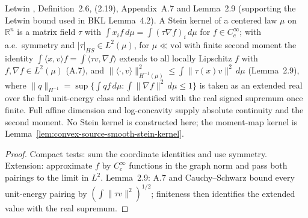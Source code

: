 \begin{lemma}
  \label{lem:letwin-stein-dual}
  \leanok
  Letwin \cite{Letwin2026QuadraticKLS}, Definition~2.6, (2.19), Appendix~A.7 and Lemma~2.9 (supporting the
  Letwin bound used in BKL Lemma~4.2). A Stein kernel of a centered law $\mu$ on $\mathbb R^n$ is a
  matrix field $\tau$ with $\int x_if\,d\mu=\int(\tau\nabla f)_i\,d\mu$ for $f\in C_c^\infty$; with
  a.e.\ symmetry and $|\tau|_{HS}\in L^2(\mu)$, for $\mu\ll\mathrm{vol}$ with finite second moment the
  identity $\int\langle x,v\rangle f=\int\langle\tau v,\nabla f\rangle$ extends to all locally
  Lipschitz $f$ with $f,\nabla f\in L^2(\mu)$ (A.7), and
  $\|\langle\cdot,v\rangle\|_{H^{-1}(\mu)}^2\le\int\|\tau(x)v\|^2\,d\mu$ (Lemma~2.9), where
  $\|q\|_{H^{-1}}=\sup\{\int qf\,d\mu:\int\|\nabla f\|^2\,d\mu\le1\}$ is taken as an extended real
  over the full unit-energy class and identified with the real signed supremum once finite. Full
  affine dimension and log-concavity supply absolute continuity and the second moment. No Stein
  kernel is constructed here; the moment-map kernel is Lemma~\ref{lem:convex-source-smooth-stein-kernel}.
\end{lemma}
\begin{proof}
  \leanok
  Compact tests: sum the coordinate identities and use symmetry. Extension: approximate $f$ by
  $C_c^\infty$ functions in the graph norm and pass both pairings to the limit in $L^2$.
  Lemma~2.9: A.7 and Cauchy--Schwarz bound every unit-energy pairing by
  $(\int\|\tau v\|^2)^{1/2}$; finiteness then identifies the extended value with the real supremum.
\end{proof}

